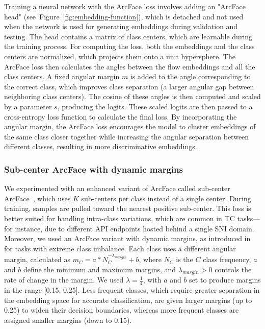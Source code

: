 \documentclass[lettersize,journal,twoside,article]{IEEEtran}
\newcommand{\figref}[1]{Figure~\ref{#1}}
\begin{document}
Training a neural network with the ArcFace loss involves adding an "ArcFace head" (see~\figref{fig:embedding-function}), which is detached and not used when the network is used for generating embeddings during validation and testing. The head contains a matrix of class centers, which are learnable during the training process. For computing the loss, both the embeddings and the class centers are normalized, which projects them onto a unit hypersphere. The ArcFace loss then calculates the angles between the flow embeddings and all the class centers. A fixed angular margin $m$ is added to the angle corresponding to the correct class, which improves class separation (a larger angular gap between neighboring class centers). The cosine of these angles is then computed and scaled by a parameter $s$, producing the logits. These scaled logits are then passed to a cross-entropy loss function to calculate the final loss. By incorporating the angular margin, the ArcFace loss encourages the model to cluster embeddings of the same class closer together while increasing the angular separation between different classes, resulting in more discriminative embeddings.

\subsubsection{Sub-center ArcFace with dynamic margins}
We experimented with an enhanced variant of ArcFace called sub-center ArcFace~\cite{Deng2020Subcenter}, which uses $K$ sub-centers per class instead of a single center. During training, samples are pulled toward the nearest positive sub-center. This loss is better suited for handling intra-class variations, which are common in TC tasks---for instance, due to different API endpoints hosted behind a single SNI domain. Moreover, we used an ArcFace variant with dynamic margins, as introduced in~\cite{Ha2020GoogleLandmark} for tasks with extreme class imbalance. Each class uses a different angular margin, calculated as $m_C = a * N_C^{-\lambda_{margin}} + b$, where $N_C$ is the $C$ class frequency, $a$ and $b$ define the minimum and maximum margins, and $\lambda_{margin} > 0$ controls the rate of change in the margin. We used $\lambda = \frac{1}{4}$, with $a$ and $b$ set to produce margins in the range [0.15, 0.25]. Less frequent classes, which require greater separation in the embedding space for accurate classification, are given larger margins (up to 0.25) to widen their decision boundaries, whereas more frequent classes are assigned smaller margins (down to 0.15).
\end{document}
